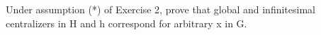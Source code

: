 Under assumption (*) of Exercise 2, prove that global and infinitesimal centralizers in H and h correspond for arbitrary x in G.
